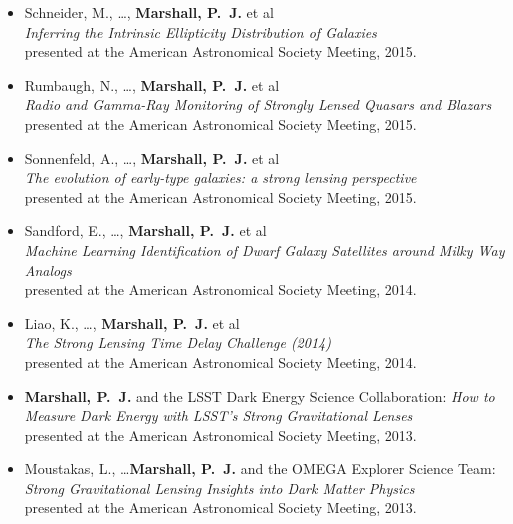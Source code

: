 \begin{itemize}

\item{Schneider, M., \ldots, \textbf{Marshall, P.~J.} et al\\
\textit{Inferring the Intrinsic Ellipticity Distribution of Galaxies}\\
presented at the {American Astronomical Society Meeting}, 2015.
}

\item{Rumbaugh, N., \ldots, \textbf{Marshall, P.~J.} et al\\
\textit{Radio and Gamma-Ray Monitoring of Strongly Lensed Quasars and Blazars}\\
presented at the {American Astronomical Society Meeting}, 2015.
}

\item{Sonnenfeld, A., \ldots, \textbf{Marshall, P.~J.} et al\\
\textit{The evolution of early-type galaxies: a strong lensing perspective}\\
presented at the {American Astronomical Society Meeting}, 2015.
}

\item{Sandford, E., \ldots, \textbf{Marshall, P.~J.} et al\\
\textit{Machine Learning Identification of Dwarf Galaxy Satellites around Milky Way Analogs}\\
presented at the {American Astronomical Society Meeting}, 2014.
}

\item{Liao, K., \ldots, \textbf{Marshall, P.~J.} et al\\
\textit{The Strong Lensing Time Delay Challenge (2014)}\\
presented at the {American Astronomical Society Meeting}, 2014.
}

\item{\textbf{Marshall, P.~J.} and the LSST Dark Energy Science Collaboration:
\textit{How to Measure Dark Energy with LSST's Strong Gravitational Lenses}\\
presented at the {American Astronomical Society Meeting}, 2013.
}

\item{{Moustakas}, L., \ldots \textbf{Marshall, P.~J.} and the OMEGA Explorer Science Team:
\textit{Strong Gravitational Lensing Insights into Dark Matter Physics}\\
presented at the {American Astronomical Society Meeting}, 2013.
}


\end{itemize}
